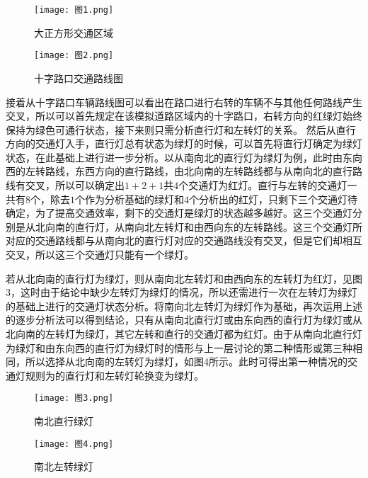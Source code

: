 \documentclass[a4paper,12pt]{article}
\numberwithin{equation}{section}
\begin{document}
		\begin{figure}[htbp]
		\centering
		\begin{minipage}[t]{0.48\textwidth}
			\centering
			\texttt{[image: 图1.png]}
			\caption{大正方形交通区域}
		\end{minipage}
		\begin{minipage}[t]{0.48\textwidth}
			\centering
			\texttt{[image: 图2.png]}
			\caption{十字路口交通路线图}
		\end{minipage}
	\end{figure}
	接着从十字路口车辆路线图可以看出在路口进行右转的车辆不与其他任何路线产生交叉，所以可以首先规定在该模拟道路区域内的十字路口，右转方向的红绿灯始终保持为绿色可通行状态，接下来则只需分析直行灯和左转灯的关系。
	然后从直行方向的交通灯入手，直行灯总有状态为绿灯的时候，可以首先将直行灯确定为绿灯状态，在此基础上进行进一步分析。以从南向北的直行灯为绿灯为例，此时由东向西的左转路线，东西方向的直行路线，由北向南的左转路线都与从南向北的直行路线有交叉，所以可以确定出$1+2+1$共$4$个交通灯为红灯。直行与左转的交通灯一共有$8$个，除去$1$个作为分析基础的绿灯和$4$个分析出的红灯，只剩下三个交通灯待确定，为了提高交通效率，剩下的交通灯是绿灯的状态越多越好。这三个交通灯分别是从北向南的直行灯，从南向北左转灯和由西向东的左转路线。这三个交通灯所对应的交通路线都与从南向北的直行灯对应的交通路线没有交叉，但是它们却相互交叉，所以这三个交通灯只能有一个绿灯。\par
	若从北向南的直行灯为绿灯，则从南向北左转灯和由西向东的左转灯为红灯，见图3，这时由于结论中缺少左转灯为绿灯的情况，所以还需进行一次在左转灯为绿灯的基础上进行的交通灯状态分析。将南向北左转灯为绿灯作为基础，再次运用上述的逐步分析法可以得到结论，只有从南向北直行灯或由东向西的直行灯为绿灯或从北向南的左转灯为绿灯，其它左转和直行的交通灯都为红灯。由于从南向北直行灯为绿灯和由东向西的直行灯为绿灯时的情形与上一层讨论的第二种情形或第三种相同，所以选择从北向南的左转灯为绿灯，如图4所示。此时可得出第一种情况的交通灯规则为的直行灯和左转灯轮换变为绿灯。\par
	\begin{figure}[htbp]
		\centering
		\begin{minipage}[t]{0.48\textwidth}
			\centering
			\texttt{[image: 图3.png]}
			\caption{南北直行绿灯}
		\end{minipage}
		\begin{minipage}[t]{0.48\textwidth}
			\centering
			\texttt{[image: 图4.png]}
			\caption{南北左转绿灯}
		\end{minipage}
	\end{figure}
\end{document}
